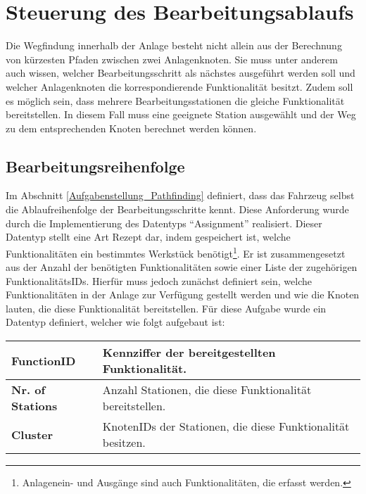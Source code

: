 	\section{Steuerung des Bearbeitungsablaufs}
		
		Die Wegfindung innerhalb der Anlage besteht nicht allein aus der Berechnung von kürzesten Pfaden zwischen zwei Anlagenknoten. Sie muss unter anderem auch wissen, welcher Bearbeitungsschritt als nächstes ausgeführt werden soll und welcher Anlagenknoten die korrespondierende Funktionalität besitzt. Zudem soll es möglich sein, dass mehrere Bearbeitungsstationen die gleiche Funktionalität bereitstellen. In diesem Fall muss eine geeignete Station ausgewählt und der Weg zu dem entsprechenden Knoten berechnet werden können.
	
		\subsection{Bearbeitungsreihenfolge}
		
			Im Abschnitt \ref{Aufgabenstellung_Pathfinding} definiert, dass das Fahrzeug selbst die Ablaufreihenfolge der Bearbeitungsschritte kennt. Diese Anforderung wurde durch die Implementierung des Datentyps "`Assignment"' realisiert. Dieser Datentyp stellt eine Art Rezept dar, indem gespeichert ist, welche Funktionalitäten ein bestimmtes Werkstück benötigt\footnote{Anlagenein- und Ausgänge sind auch Funktionalitäten, die erfasst werden.}. Er ist zusammengesetzt aus der Anzahl der benötigten Funktionalitäten sowie einer Liste der zugehörigen FunktionalitätsIDs. Hierfür muss jedoch zunächst definiert sein, welche Funktionalitäten in der Anlage zur Verfügung gestellt werden und wie die Knoten lauten, die diese Funktionalität bereitstellen. Für diese Aufgabe wurde ein Datentyp definiert, welcher wie folgt aufgebaut ist:
			
			\begin{longtable}{| l | l |}
				
				\hline
				\textbf{FunctionID} & Kennziffer der bereitgestellten Funktionalität.\\ \hline
				\textbf{Nr. of Stations} & Anzahl Stationen, die diese Funktionalität bereitstellen.\\ \hline
				\textbf{Cluster} & KnotenIDs der Stationen, die diese Funktionalität besitzen.\\
				\hline
				
			\end{longtable}
			
